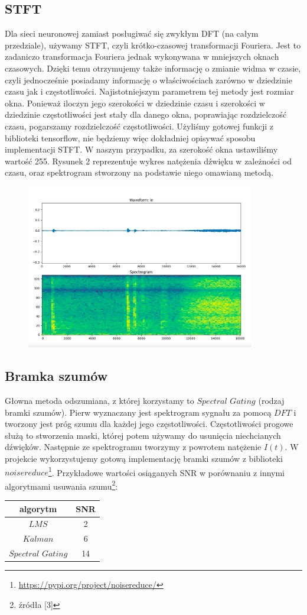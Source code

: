 \documentclass[polish]{article}
\begin{document}
\subsection{STFT}
Dla sieci neuronowej zamiast posługiwać się zwykłym DFT (na całym przedziale), używamy STFT, czyli krótko-czasowej transformacji Fouriera. Jest to zadaniczo transformacja Fouriera jednak wykonywana w mniejszych oknach czasowych. Dzięki temu otrzymujemy także informację o zmianie widma w czasie, czyli jednocześnie posiadamy informację o właściwościach zarówno w dziedzinie czasu jak i częstotliwości. Najistotniejszym parametrem tej metody jest rozmiar okna. Ponieważ iloczyn jego szerokości w dziedzinie czasu i szerokości w dziedzinie częstotliwości jest stały dla danego okna, poprawiając rozdzielczość czasu, pogarszamy rozdzielczość częstotliwości. Użyliśmy gotowej funkcji z biblioteki tensorflow, nie będziemy więc dokładniej opisywać sposobu implementacji STFT. W naszym przypadku, za szerokość okna ustawiliśmy wartość 255. Rysunek 2 reprezentuje wykres natężenia dźwięku w zależności od czasu, oraz spektrogram stworzony na podstawie niego omawianą metodą.
\begin{figure}[H]
	\centering
	\includegraphics[width=10cm]{STFT.png}
	\caption{}
\end{figure}

\subsection{Bramka szumów}
Głowna metoda odszumiana, z której korzystamy to $Spectral$ $Gating$ (rodzaj bramki szumów).  Pierw wyznaczany jest spektrogram sygnału za pomocą $DFT$ i 
tworzony jest próg szumu dla każdej jego częstotliwości.
Częstotliwości progowe służą to stworzenia maski, której potem używamy do usunięcia niechcianych dźwięków.
Następnie ze spektrogramu tworzymy z powrotem natężenie $I(t)$. W projekcie wykorzystujemy gotową implementację bramki szumów z biblioteki $noisereduce$\footnote{\url{https://pypi.org/project/noisereduce/}}. Przykładowe wartości osiąganych SNR w porównaniu z innymi 
algorytmami usuwania szumu\footnote{źródła [3]}:
\begin{center}
\begin{tabular}{c  | c }
algorytm & SNR \\
\hline
$LMS$ & 2 \\
$Kalman$ & 6 \\
$Spectral$ $Gating$ & 14
\end{tabular}
\end{center}
\end{document}
